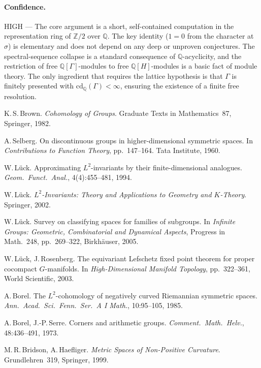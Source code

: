 \paragraph{Confidence.} HIGH --- The core argument is a short, self-contained
computation in the representation ring of $\mathbb{Z}/2$ over $\mathbb{Q}$.
The key identity ($1=0$ from the character at $\sigma$) is elementary and
does not depend on any deep or unproven conjectures. The spectral-sequence
collapse is a standard consequence of $\mathbb{Q}$-acyclicity, and the
restriction of free $\mathbb{Q}[\Gamma]$-modules to free
$\mathbb{Q}[H]$-modules is a basic fact of module theory. The only ingredient
that requires the lattice hypothesis is that $\Gamma$ is finitely presented
with $\mathrm{cd}_\mathbb{Q}(\Gamma)<\infty$, ensuring the existence of a
finite free resolution.


 K.\,S.\,Brown.
\emph{Cohomology of Groups}.
Graduate Texts in Mathematics~87, Springer, 1982.

 A.\,Selberg.
On discontinuous groups in higher-dimensional symmetric spaces.
In \emph{Contributions to Function Theory}, pp.~147--164. Tata Institute, 1960.

 W.\,L\"uck.
Approximating $L^2$-invariants by their finite-dimensional analogues.
\emph{Geom.\ Funct.\ Anal.}, 4(4):455--481, 1994.

 W.\,L\"uck.
\emph{$L^2$-Invariants: Theory and Applications to Geometry and $K$-Theory}.
Springer, 2002.

 W.\,L\"uck.
Survey on classifying spaces for families of subgroups.
In \emph{Infinite Groups: Geometric, Combinatorial and Dynamical Aspects},
Progress in Math.~248, pp.~269--322, Birkh\"auser, 2005.

 W.\,L\"uck, J.\,Rosenberg.
The equivariant Lefschetz fixed point theorem for proper cocompact
$G$-manifolds. In \emph{High-Dimensional Manifold Topology},
pp.~322--361, World Scientific, 2003.

 A.\,Borel.
The $L^2$-cohomology of negatively curved Riemannian symmetric spaces.
\emph{Ann.\ Acad.\ Sci.\ Fenn.\ Ser.\ A I Math.}, 10:95--105, 1985.

 A.\,Borel, J.-P.\,Serre.
Corners and arithmetic groups.
\emph{Comment.\ Math.\ Helv.}, 48:436--491, 1973.

 M.\,R.\,Bridson, A.\,Haefliger.
\emph{Metric Spaces of Non-Positive Curvature}.
Grundlehren~319, Springer, 1999.

